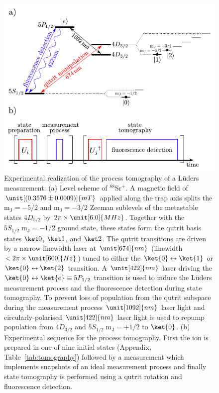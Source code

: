 \documentclass[12pt,
onecolumn,
superscriptaddress,
floatfix,
]{revtex4-2}
\begin{document}
\begin{figure}[htp]
\includegraphics[width=\linewidth]{fig1.pdf}
\caption{\label{fig:experiment}
Experimental realization of the process tomography of a Lüders measurement.
(a)
Level scheme of $^{88}\mathrm{Sr}^{+}$.
A magnetic field of $\unit[(0.3576\pm 0.0009)]{mT}$ applied along the trap 
 axis splits the $\mathrm{m_J}= -5/2$ and $\mathrm{m_J}= -3/2$ Zeeman
 sublevels of the metastable states $4D_{5/2}$ by $2\pi\times \unit[6.0]{MHz}$.
Together with the $5S_{1/2}\;\mathrm{m_J}= -1/2$ ground state, these states 
 form the qutrit basis states $\ket0$, $\ket1$, and $\ket2$.
The qutrit transitions are driven by a narrow-linewidth laser at $\unit[674]{nm}$
 (linewidth $<2\pi\times \unit[600]{Hz}$) tuned to either the
 $\ket{0} \leftrightarrow \ket{1}$ or $\ket{0} \leftrightarrow \ket{2}$ transition.
A $\unit[422]{nm}$ laser driving the $\ket{0} \leftrightarrow \ket{e} \equiv 5P_{1/2}$ 
 transition is used to induce the Lüders measurement process and the fluorescence
 detection during state tomography.
To prevent loss of population from the qutrit subspace during the measurement process $\unit[1092]{nm}$ laser light and circularly-polarised $\unit[422]{nm}$ laser light is used to repump population from $4D_{3/2}$ and $5S_{1/2}\;\mathrm{m_J}= +1/2$ to $\ket{0}$.
(b)
Experimental sequence for the process tomography.
First the ion is prepared in one of nine initial states (Appendix, Table~\ref{tab:tomography}) followed 
 by a measurement which implements snapshots of an ideal 
 measurement process and finally state tomography is performed using a qutrit rotation and fluorescence detection.}
\end{figure}
\end{document}
